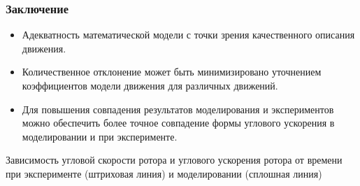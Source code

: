%





\begin{frame}
\frametitle{Заключение}
\begin{itemize}
	\item Адекватность математической модели с точки зрения качественного описания движения.
	\item Количественное отклонение может быть минимизировано уточнением коэффициентов модели движения для различных движений.
	\item Для повышения совпадения результатов моделирования и экспериментов можно обеспечить более точное совпадение формы углового ускорения в моделировании и при эксперименте.
\end{itemize}

Зависимость угловой скорости ротора и углового ускорения ротора от времени при эксперименте (штриховая линия) и моделировании (сплошная линия)

\begin{minipage}[t]{0.47\linewidth}
\end{minipage}
\hfill
\begin{minipage}[t]{0.47\linewidth}
\end{minipage}

\end{frame}



